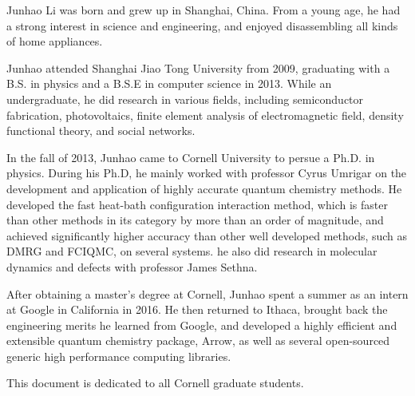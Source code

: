 \documentclass[phd,tocprelim]{cornell}
\begin{document}
\begin{biosketch}
Junhao Li was born and grew up in Shanghai, China.
From a young age, he had a strong interest in science and engineering, and enjoyed disassembling all kinds of home appliances.

Junhao attended Shanghai Jiao Tong University from 2009, graduating with a B.S. in physics and a B.S.E in computer science in 2013.
While an undergraduate, he did research in various fields, including semiconductor fabrication, photovoltaics, finite element analysis of electromagnetic field, density functional theory, and social networks.

In the fall of 2013, Junhao came to Cornell University to persue a Ph.D. in physics.
During his Ph.D, he mainly worked with professor Cyrus Umrigar on the development and application of highly accurate quantum chemistry methods.
He developed the fast heat-bath configuration interaction method, which is faster than other methods in its category by more than an order of magnitude, and achieved significantly higher accuracy than other well developed methods, such as DMRG and FCIQMC, on several systems.
he also did research in molecular dynamics and defects with professor James Sethna.

After obtaining a master's degree at Cornell, Junhao spent a summer as an intern at Google in California in 2016.
He then returned to Ithaca, brought back the engineering merits he learned from Google, and developed a highly efficient and extensible quantum chemistry package, Arrow, as well as several open-sourced generic high performance computing libraries.

\end{biosketch}

\begin{dedication}
This document is dedicated to all Cornell graduate students.
\end{dedication}
\end{document}
